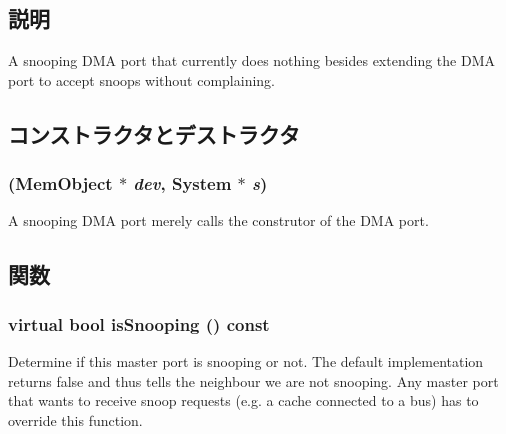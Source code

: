 \subsection{説明}
A snooping DMA port that currently does nothing besides extending the DMA port to accept snoops without complaining. 

\subsection{コンストラクタとデストラクタ}
\hypertarget{classArmISA_1_1TableWalker_1_1SnoopingDmaPort_aedb9236e2002a256faa055089d764d32}{
\subsubsection[{SnoopingDmaPort}]{ ({\bf MemObject} $\ast$ {\em dev}, \/  {\bf System} $\ast$ {\em s})}}
\label{classArmISA_1_1TableWalker_1_1SnoopingDmaPort_aedb9236e2002a256faa055089d764d32}
A snooping DMA port merely calls the construtor of the DMA port. 


\begin{DoxyCode}
813                                                    :
814             DmaPort(dev, s)
815         { }
    };
\end{DoxyCode}


\subsection{関数}
\hypertarget{classArmISA_1_1TableWalker_1_1SnoopingDmaPort_a32602a6a3c3d66a639455036d6c08dd6}{
\subsubsection[{isSnooping}]{\setlength{\rightskip}{0pt plus 5cm}virtual bool isSnooping () const}}
\label{classArmISA_1_1TableWalker_1_1SnoopingDmaPort_a32602a6a3c3d66a639455036d6c08dd6}
Determine if this master port is snooping or not. The default implementation returns false and thus tells the neighbour we are not snooping. Any master port that wants to receive snoop requests (e.g. a cache connected to a bus) has to override this function.


